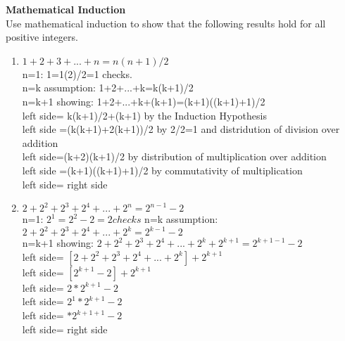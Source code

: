 \documentclass[12pt]{article}
\begin{document}
\textbf{Mathematical Induction}\\
\indent Use mathematical induction to show that the following results hold for all positive integers.\\
\begin{enumerate}
\item
$1 + 2 + 3 +. . .+n = n(n+1)/2$\\
n=1: 1=1(2)/2=1 checks.\\
n=k assumption: 1+2+...+k=k(k+1)/2\\
n=k+1 showing: 1+2+...+k+(k+1)=(k+1)((k+1)+1)/2 \\
  left side= k(k+1)/2+(k+1) by the Induction Hypothesis \\
  left side =(k(k+1)+2(k+1))/2 by 2/2=1 and distridution of division over addition \\
  left side=(k+2)(k+1)/2 by distribution of multiplication over addition \\
 left side =(k+1)((k+1)+1)/2 by commutativity of multiplication \\
 left side= right side
\item
$2 + 2^2+ 2^3+ 2^4+. . .+ 2^n= 2^{n-1} - 2$\\
n=1: $2^1=2^2-2=2 checks$
n=k assumption:
$2 + 2^2+ 2^3+ 2^4+. . .+ 2^k= 2^{k-1} - 2$\\
n=k+1 showing:
$2 + 2^2+ 2^3+ 2^4+. . .+ 2^k + 2^{k+1}= 2^{k+1-1} - 2$\\
left side= $[2 + 2^2+ 2^3+ 2^4+. . .+ 2^k] + 2^{k+1}$\\
left side= $[2^{k+1}-2] + 2^{k+1}$\\
left side= $2*2^{k+1}-2$\\
left side= $2^1*2^{k+1}-2$\\
left side= $*2^{k+1+1}-2$\\
left side= right side
\end{enumerate}
\end{document}
